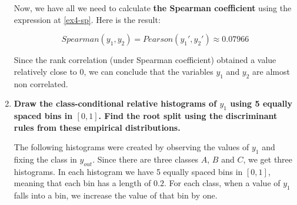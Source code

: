 \documentclass[12pt]{article}
\begin{document}
\begin{enumerate}[leftmargin=\labelsep]
    Now, we have all we need to calculate \textbf{the Spearman coefficient} using the expression at \eqref{ex4-sp}. Here is the result:

    \[
        Spearman(y_{1}, y_{2}) = Pearson(y_{1}', y_{2}') \approx 0.07966
    \]

    Since the rank correlation (under Spearman coefficient) obtained a value relatively close to 0, we can conclude that the variables $y_1$ and $y_2$ are almost non correlated.

    \item \textbf{Draw the class-conditional relative histograms of $y_1$ using 5 equally spaced bins in $[0,1]$.
    Find the root split using the discriminant rules from these empirical distributions.}

    \vskip 0.3cm
    The following histograms were created by observing the values of $y_1$ and fixing the class in $y_{out}$. Since there are three classes $A$, $B$ and $C$,
    we get three histograms. In each histogram we have 5 equally spaced bins in $[0,1]$, meaning that each bin has a length of $0.2$. For each class, when a value
    of $y_1$ falls into a bin, we increase the value of that bin by one.


\end{enumerate}
\end{document}
